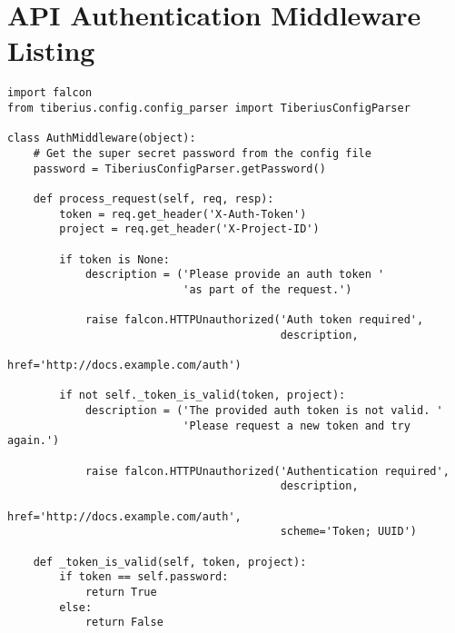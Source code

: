 \chapter{API Authentication Middleware Listing}
\label{app:authentication_middleware}

\begin{lstlisting}[style=custompython]
import falcon
from tiberius.config.config_parser import TiberiusConfigParser

class AuthMiddleware(object):
    # Get the super secret password from the config file
    password = TiberiusConfigParser.getPassword()

    def process_request(self, req, resp):
        token = req.get_header('X-Auth-Token')
        project = req.get_header('X-Project-ID')

        if token is None:
            description = ('Please provide an auth token '
                           'as part of the request.')

            raise falcon.HTTPUnauthorized('Auth token required',
                                          description,
                                          href='http://docs.example.com/auth')

        if not self._token_is_valid(token, project):
            description = ('The provided auth token is not valid. '
                           'Please request a new token and try again.')

            raise falcon.HTTPUnauthorized('Authentication required',
                                          description,
                                          href='http://docs.example.com/auth',
                                          scheme='Token; UUID')

    def _token_is_valid(self, token, project):
        if token == self.password:
            return True
        else:
            return False

\end{lstlisting}

